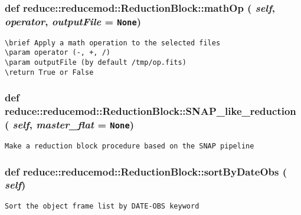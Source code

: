 \subsubsection{\setlength{\rightskip}{0pt plus 5cm}def reduce::reducemod::Reduction\-Block::math\-Op ( {\em self},  {\em operator},  {\em output\-File} = {\tt None})}\label{classreduce_1_1reducemod_1_1ReductionBlock_a12dc11d8ca1f5e7142ff512d09bada2}




\footnotesize\begin{verbatim}
\brief Apply a math operation to the selected files
\param operator (-, +, /)
\param outputFile (by default /tmp/op.fits)
\return True or False
\end{verbatim}
\normalsize
\subsubsection{\setlength{\rightskip}{0pt plus 5cm}def reduce::reducemod::Reduction\-Block::SNAP\_\-like\_\-reduction ( {\em self},  {\em master\_\-flat} = {\tt None})}\label{classreduce_1_1reducemod_1_1ReductionBlock_863f04bf4f5f5bc3e972f8fde15501df}




\footnotesize\begin{verbatim}Make a reduction block procedure based on the SNAP pipeline\end{verbatim}
\normalsize
\subsubsection{\setlength{\rightskip}{0pt plus 5cm}def reduce::reducemod::Reduction\-Block::sort\-By\-Date\-Obs ( {\em self})}\label{classreduce_1_1reducemod_1_1ReductionBlock_539f6a93f5d51874af9c2a822d6c2dae}




\footnotesize\begin{verbatim}Sort the object frame list by DATE-OBS keyword\end{verbatim}
\normalsize
